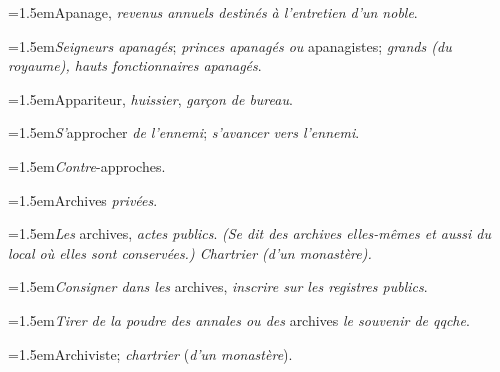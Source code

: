 \par{\dictfontsize\hangindent=1.5em\noindent Apanage, \textit{revenus annuels destinés à l’entretien d’un noble}. \par}
\par{\dictfontsize\hangindent=1.5em\noindent \textit{Seigneurs apanagés}; \textit{princes apanagés ou} apanagistes; \textit{grands (du royaume), hauts fonctionnaires apanagés}. \par}
\par{\dictfontsize\hangindent=1.5em\noindent Appariteur, \textit{huissier}, \textit{garçon de bureau}. \par}
\par{\dictfontsize\hangindent=1.5em\noindent \textit{S’}approcher \textit{de l’ennemi}; \textit{s’avancer vers l’ennemi}. \par}
\par{\dictfontsize\hangindent=1.5em\noindent \textit{Contre}-approches. \par}
\par{\dictfontsize\hangindent=1.5em\noindent Archives \textit{privées}. \par}
\par{\dictfontsize\hangindent=1.5em\noindent \textit{Les} archives, \textit{actes publics}. \textit{(Se dit des archives elles-mêmes et aussi du local où elles sont conservées.) Chartrier (d’un monastère).} \par}
\par{\dictfontsize\hangindent=1.5em\noindent \textit{Consigner dans les} archives, \textit{inscrire sur les registres publics}. \par}
\par{\dictfontsize\hangindent=1.5em\noindent \textit{Tirer de la poudre des annales ou des} archives \textit{le souvenir de qqche}. \par}
\par{\dictfontsize\hangindent=1.5em\noindent Archiviste; \textit{chartrier} (\textit{d’un monastère}). \par}
